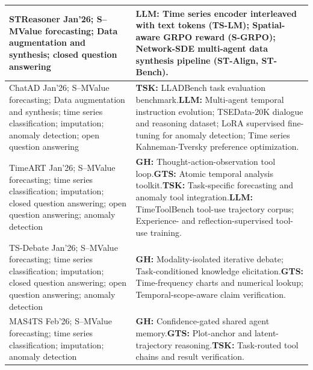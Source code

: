 \documentclass[preprints,article,submit,moreauthors]{Definitions/mdpi}
\newcommand{\typeSMshort}{\textsf{S--M}}
\begin{document}
\begin{longtable}{@{}>{\raggedright\arraybackslash}p{}p{}@{}}
STReasoner \citep{streasoner2026} Jan'26; \typeSMshort{}\newline Value forecasting; Data augmentation and synthesis; closed question answering & \textbf{LLM:} Time series encoder interleaved with text tokens (TS-LM); Spatial-aware GRPO reward (S-GRPO); Network-SDE multi-agent data synthesis pipeline (ST-Align, ST-Bench).\\\midrule
ChatAD \citep{chatad2026} Jan'26; \typeSMshort{}\newline Value forecasting; Data augmentation and synthesis; time series classification; imputation; anomaly detection; open question answering & \textbf{TSK:} LLADBench task evaluation benchmark.\newline\textbf{LLM:} Multi-agent temporal instruction evolution; TSEData-20K dialogue and reasoning dataset; LoRA supervised fine-tuning for anomaly detection; Time series Kahneman-Tversky preference optimization.\\\midrule
TimeART \citep{timeart2026} Jan'26; \typeSMshort{}\newline Value forecasting; time series classification; imputation; closed question answering; open question answering; anomaly detection & \textbf{GH:} Thought-action-observation tool loop.\newline\textbf{GTS:} Atomic temporal analysis toolkit.\newline\textbf{TSK:} Task-specific forecasting and anomaly tool integration.\newline\textbf{LLM:} TimeToolBench tool-use trajectory corpus; Experience- and reflection-supervised tool-use training.\\\midrule
TS-Debate \citep{multimodaldebate2026} Jan'26; \typeSMshort{}\newline Value forecasting; time series classification; imputation; closed question answering; open question answering; anomaly detection & \textbf{GH:} Modality-isolated iterative debate; Task-conditioned knowledge elicitation.\newline\textbf{GTS:} Time-frequency charts and numerical lookup; Temporal-scope-aware claim verification.\\\midrule
MAS4TS \citep{mas4ts2026} Feb'26; \typeSMshort{}\newline Value forecasting; time series classification; imputation; anomaly detection & \textbf{GH:} Confidence-gated shared agent memory.\newline\textbf{GTS:} Plot-anchor and latent-trajectory reasoning.\newline\textbf{TSK:} Task-routed tool chains and result verification.\\\midrule

\end{longtable}
\end{document}
